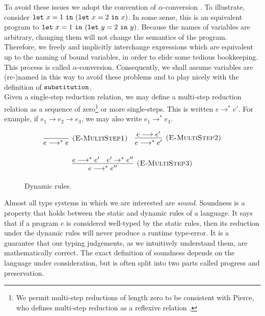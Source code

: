To avoid these issues we adopt the convention of $\alpha$-conversion \cite[p. 71]{tapl}. To illustrate, consider $\mathtt{let}~ x = 1~\mathtt{in}~ (\mathtt{let}~ x = 2~\mathtt{in}~ x)$. In some sense, this is an equivalent program to $\mathtt{let}~ x = 1~\mathtt{in}~ (\mathtt{let}~ y = 2~\mathtt{in}~ y)$. Because the names of variables are arbitrary, changing them will not change the semantics of the program. Therefore, we freely and implicitly interchange expressions which are equivalent up to the naming of bound variables, in order to elide some tedious bookkeeping. This process is called $\alpha$-conversion. Consequently, we shall assume variables are (re-)named in this way to avoid these problems and to play nicely with the definition of $\mathtt{substitution}$. \\

Given a single-step reduction relation, we may define a multi-step reduction relation as a sequence of zero\footnote{We permit multi-step reductions of length zero to be consistent with Pierce, who defines multi-step reduction as a reflexive relation \cite[p. 39]{tapl}.} or more single-steps. This is written $e \longrightarrow^* e'$. For example, if $e_1 \longrightarrow e_2 \longrightarrow e_3$, we may also write $e_1 \longrightarrow^* e_3$. 

\begin{figure}[h]

\noindent
{}

\[
\begin{array}{c}

\infer[\textsc{(E-MultiStep1)}]
	{ e \longrightarrow^{*}  e}
	{}
~~~
\infer[\textsc{(E-MultiStep2)}]
	{ e \longrightarrow^{*}  e'}
	{ e \longrightarrow  e'} \\[3ex]
	
\infer[\textsc{(E-MultiStep3)}]
	{e \longrightarrow^{*}  e''}
	{ e \longrightarrow^{*}  e' &  e' \rightarrow^{*}  e''}
\end{array}
\]
\vspace{-7pt}
\caption{Dynamic rules.}
\label{This is the label.}
\end{figure}

Almost all type systems in which we are interested are \textit{sound}. Soundness is a property that holds between the static and dynamic rules of a language. It says that if a program $e$ is considered well-typed by the static rules, then its reduction under the dynamic rules will never produce a runtime type-error. It is a guarantee that our typing judgements, as we intuitively understand them, are mathematically correct. The exact definition of soundness depends on the language under consideration, but is often split into two parts called progress and preservation.

